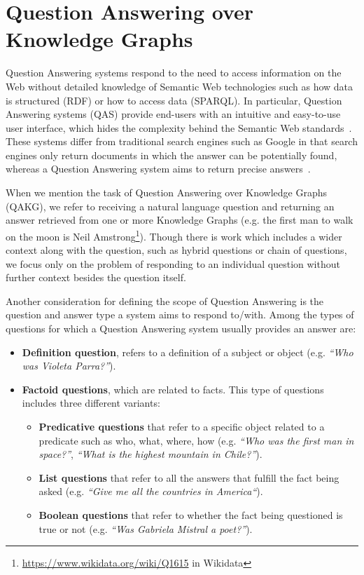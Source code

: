 \section{Question Answering over Knowledge Graphs}
\label{cap2:qakg}
Question Answering systems respond to the need to access information on the Web without 
detailed knowledge of Semantic Web technologies such as how data is structured (RDF) or how to 
access data (SPARQL). In particular, Question Answering systems (QAS) provide end-users with an 
intuitive and easy-to-use user interface, which hides the complexity behind the Semantic Web 
standards~\cite{qa:intro-UngerFC14}. These systems differ from traditional search engines such 
as Google in that search engines only return documents in which the answer can be potentially 
found, whereas a Question Answering system aims to return precise answers~\cite{qa:LopezUSM11}.

When we mention the task of Question Answering over Knowledge Graphs (QAKG), we refer to 
receiving a natural language question and returning an answer retrieved from one or more 
Knowledge Graphs (e.g. the first man to walk on the moon is Neil 
Amstrong\footnote{\url{https://www.wikidata.org/wiki/Q1615} in Wikidata}). Though there is work which 
includes a wider context along with the question, such as hybrid questions or chain of questions, 
we focus only on the problem of responding to an individual question without further context 
besides the question itself.

Another consideration for defining the scope of Question Answering is the question and answer 
type a system aims to respond to/with. Among the types of questions for which a Question 
Answering system usually provides an answer are:

\begin{itemize}
    \item \textbf{Definition question}, refers to a definition of a subject or object (e.g. 
    \textit{“Who was Violeta Parra?”}).
    \item \textbf{Factoid questions}, which are related to facts. This type of questions 
    includes three different variants:
    \begin{itemize}
        \item \textbf{Predicative questions} that refer to a specific object related to a predicate 
        such as who, what, where, how (e.g. \textit{“Who was the first man in space?”}, 
        \textit{“What is the highest mountain in Chile?”}).
        \item \textbf{List questions} that refer to all the answers that fulfill the fact being 
        asked (e.g. \textit{“Give me all the countries in America“}).
        \item \textbf{Boolean questions} that refer to whether the fact being questioned is true 
        or not (e.g. \textit{“Was Gabriela Mistral a poet?”}).
    \end{itemize}
\end{itemize}

